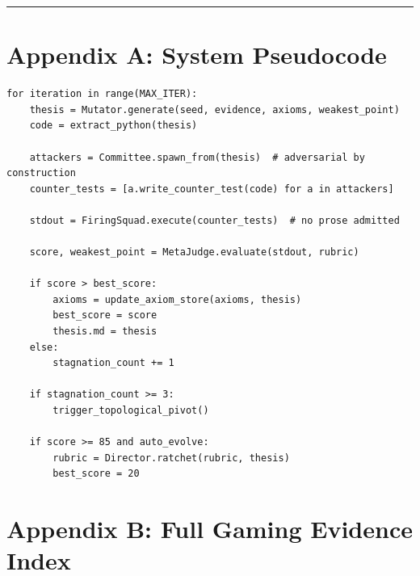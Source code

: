\documentclass[
]{article}
\begin{document}
\begin{center}\rule{0.5\linewidth}{0.5pt}\end{center}




\appendix
\section{Appendix A: System
Pseudocode}\label{appendix-a-system-pseudocode}

\begin{verbatim}
for iteration in range(MAX_ITER):
    thesis = Mutator.generate(seed, evidence, axioms, weakest_point)
    code = extract_python(thesis)

    attackers = Committee.spawn_from(thesis)  # adversarial by construction
    counter_tests = [a.write_counter_test(code) for a in attackers]

    stdout = FiringSquad.execute(counter_tests)  # no prose admitted

    score, weakest_point = MetaJudge.evaluate(stdout, rubric)

    if score > best_score:
        axioms = update_axiom_store(axioms, thesis)
        best_score = score
        thesis.md = thesis
    else:
        stagnation_count += 1

    if stagnation_count >= 3:
        trigger_topological_pivot()

    if score >= 85 and auto_evolve:
        rubric = Director.ratchet(rubric, thesis)
        best_score = 20
\end{verbatim}

\section{Appendix B: Full Gaming Evidence
Index}\label{appendix-b-full-gaming-evidence-index}
\end{document}
